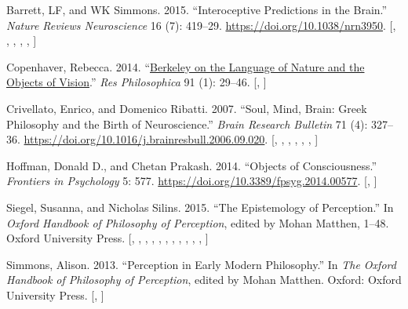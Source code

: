 \documentclass[
  12pt,
  a4paper,
  oneside]{scrbook}
\newlength{\cslhangindent}
\newlength{\cslentryspacingunit} %
\newenvironment{CSLReferences}[2] %
 {%
  \setlength{\parindent}{0pt}
  \ifodd #1
  \let\oldpar\par
  \def\par{\hangindent=\cslhangindent\oldpar}
  \fi
  \setlength{\parskip}{#2\cslentryspacingunit}
 }%
 {}
\begin{document}
\hypertarget{refs_multibib35}{}
\begin{CSLReferences}{1}{0}
\leavevmode{}%
Barrett, LF, and WK Simmons. 2015. {``Interoceptive Predictions in the
Brain.''} \emph{Nature Reviews Neuroscience} 16 (7): 419--29.
\url{https://doi.org/10.1038/nrn3950}.
{[},
\protect\hyperlink{cite_2}{\pageref{cite_2}},
\protect\hyperlink{cite_5}{\pageref{cite_5}},
\protect\hyperlink{cite_6}{\pageref{cite_6}},
\protect\hyperlink{cite_7}{\pageref{cite_7}},
\protect\hyperlink{cite_36}{\pageref{cite_36}}{]}

\leavevmode{}%
Copenhaver, Rebecca. 2014. {``\href{}{Berkeley on the Language of Nature
and the Objects of Vision}.''} \emph{Res Philosophica} 91 (1): 29--46.
{[},
\protect\hyperlink{cite_5}{\pageref{cite_5}}{]}

\leavevmode{}%
Crivellato, Enrico, and Domenico Ribatti. 2007. {``Soul, Mind, Brain:
Greek Philosophy and the Birth of Neuroscience.''} \emph{Brain Research
Bulletin} 71 (4): 327--36.
\url{https://doi.org/10.1016/j.brainresbull.2006.09.020}.
{[},
\protect\hyperlink{cite_1}{\pageref{cite_1}},
\protect\hyperlink{cite_2}{\pageref{cite_2}},
\protect\hyperlink{cite_3}{\pageref{cite_3}},
\protect\hyperlink{cite_7}{\pageref{cite_7}},
\protect\hyperlink{cite_26}{\pageref{cite_26}},
\protect\hyperlink{cite_36}{\pageref{cite_36}}{]}

\leavevmode{}%
Hoffman, Donald D., and Chetan Prakash. 2014. {``Objects of
Consciousness.''} \emph{Frontiers in Psychology} 5: 577.
\url{https://doi.org/10.3389/fpsyg.2014.00577}.
{[},
\protect\hyperlink{cite_5}{\pageref{cite_5}}{]}

\leavevmode{}%
Siegel, Susanna, and Nicholas Silins. 2015. {``The Epistemology of
Perception.''} In \emph{Oxford Handbook of Philosophy of Perception},
edited by Mohan Matthen, 1--48. Oxford University Press.
{[},
\protect\hyperlink{cite_5}{\pageref{cite_5}},
\protect\hyperlink{cite_12}{\pageref{cite_12}},
\protect\hyperlink{cite_13}{\pageref{cite_13}},
\protect\hyperlink{cite_17}{\pageref{cite_17}},
\protect\hyperlink{cite_21}{\pageref{cite_21}},
\protect\hyperlink{cite_27}{\pageref{cite_27}},
\protect\hyperlink{cite_32}{\pageref{cite_32}},
\protect\hyperlink{cite_33}{\pageref{cite_33}},
\protect\hyperlink{cite_34}{\pageref{cite_34}},
\protect\hyperlink{cite_35}{\pageref{cite_35}},
\protect\hyperlink{cite_36}{\pageref{cite_36}}{]}

\leavevmode{}%
Simmons, Alison. 2013. {``Perception in Early Modern Philosophy.''} In
\emph{The Oxford Handbook of Philosophy of Perception}, edited by Mohan
Matthen. Oxford: Oxford University Press.
{[},
\protect\hyperlink{cite_5}{\pageref{cite_5}}{]}

\end{CSLReferences}


\backmatter
\end{document}
